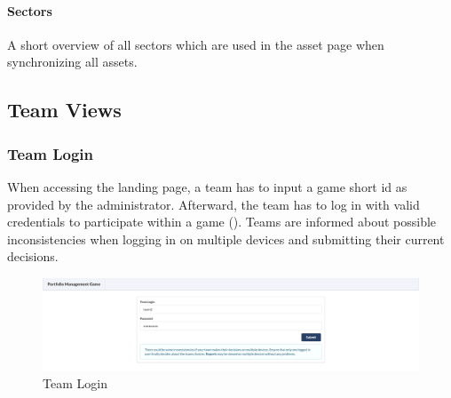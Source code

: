 \paragraph{Sectors}
A short overview of all sectors which are used in the asset page when synchronizing all assets.


\subsection{Team Views}

\subsubsection{Team Login}
When accessing the landing page, a team has to input a game short id as provided by the administrator. Afterward, the team has to log in with valid credentials to participate within a game (). Teams are informed about possible inconsistencies when logging in on multiple devices and submitting their current decisions.
\begin{figure}[h!]
  \centering
  \includegraphics[scale=0.2]{img/application-overview/teams/01_login.png}
  \caption{Team Login}
  \label{fig:team_login}
\end{figure}

